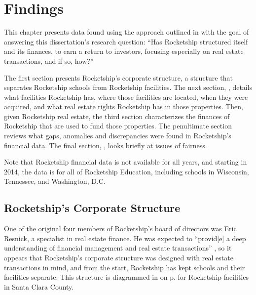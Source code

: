 
\begin{comment}
  Explaining the real estate-related finances of Rocketship Education is the heart of this dissertation. Where do Rocketship's revenues come from? Where are they spending that revenue? Are there investors who make money off of Rocketship? And, critically, if Rocketship takes in more money than it spends on education, where does that money go?
\end{comment}
\chapter{Findings}
\label{ch:findings}

This chapter presents data found using the approach outlined in  with the goal of answering this dissertation's research question: ``Has Rocketship structured itself and its finances, to earn a return to investors, focusing especially on real estate transactions, and if so, how?''

The first section presents Rocketship's corporate structure, a structure that separates Rocketship schools from Rocketship facilities. The next section, , details what facilities Rocketship has, where those facilities are located, when they were acquired, and what real estate rights Rocketship has in those properties. Then, given Rocketship real estate, the third section characterizes the finances of Rocketship that are used to fund those properties. The penultimate section reviews what gaps, anomalies and discrepancies were found in Rocketship's financial data. The final section, , looks briefly at issues of fairness.

Note that Rocketship financial data is not available for all years, and starting in 2014, the data is for all of Rocketship Education, including schools in Wisconsin, Tennessee, and Washington, D.C.


\section{Rocketship's Corporate Structure}
\label{sec:RSED-corporate-structure}\indent%

One of the original four members of Rocketship's board of directors was Eric Resnick, a specialist in real estate finance. He was expected to ``provid[e] a deep understanding of financial management and real estate transactions'' \parencite[13]{Danner2006}, so it appears that Rocketship's corporate structure was designed with real estate transactions in mind, and from the start, Rocketship has kept schools and their facilities separate. This structure is diagrammed in  on p.\pageref{fig:corporate-structure} for Rocketship facilities in Santa Clara County.

